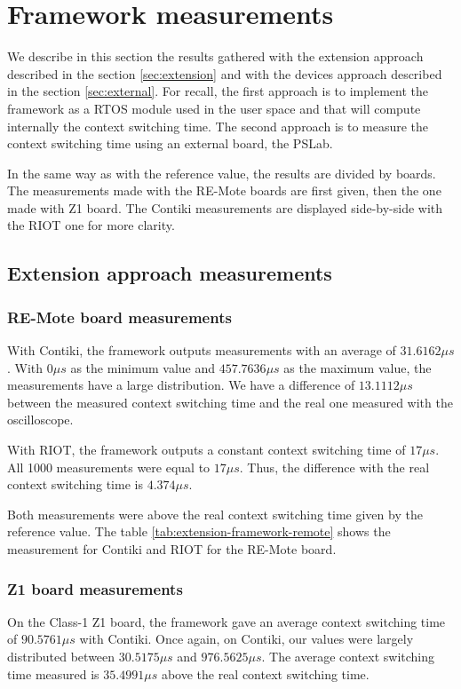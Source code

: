 \section{Framework measurements}

We describe in this section the results gathered with the extension approach described in the section \ref{sec:extension} and with the devices approach described in the section \ref{sec:external}.
For recall, the first approach is to implement the framework as a RTOS module used in the user space and that will compute internally the context switching time.
The second approach is to measure the context switching time using an external board, the PSLab.

In the same way as with the reference value, the results are divided by boards.
The measurements made with the RE-Mote boards are first given, then the one made with Z1 board.
The Contiki measurements are displayed side-by-side with the RIOT one for more clarity.

\subsection{Extension approach measurements}

\subsubsection{RE-Mote board measurements}
With Contiki, the framework outputs measurements with an average of $31.6162\mu s$.
With $0\mu s$ as the minimum value and $457.7636\mu s$ as the maximum value, the measurements have a large distribution.
We have a difference of $13.1112 \mu s$ between the measured context switching time and the real one measured with the oscilloscope.

With RIOT, the framework outputs a constant context switching time of $17\mu s$.
All 1000 measurements were equal to $17\mu s$.
Thus, the difference with the real context switching time is $4.374\mu s$.

Both measurements were above the real context switching time given by the reference value.
The table \ref{tab:extension-framework-remote} shows the measurement for Contiki and RIOT for the RE-Mote board.



\subsubsection{Z1 board measurements}
On the Class-1 Z1 board, the framework gave an average context switching time of $90.5761\mu s$ with Contiki.
Once again, on Contiki, our values were largely distributed between $30.5175\mu s$ and $976.5625\mu s$.
The average context switching time measured is $35.4991 \mu s$ above the real context switching time.

